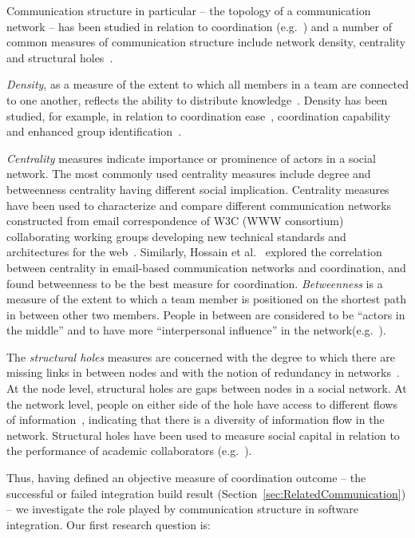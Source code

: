 \documentclass[12pt,oneside]{book}
\begin{document}
Communication structure in particular -- the topology of a communication network
-- has been studied in relation to coordination
(e.g.~\cite{hossain:cscw:2006,hinds:cscw:2006}) and a number of common measures of
communication structure include network density, centrality and structural
holes~\cite{Wasserman:1994sq,Freeman:1979rl}.


\emph{Density}, as a measure of the extent to which all members in a team are
connected to one another, reflects the ability to distribute
knowledge~\cite{Rulke:2000ys}. Density has been studied, for example, in relation
to coordination ease~\cite{hinds:cscw:2006}, coordination
capability~\cite{hossain:cscw:2006} and enhanced group
identification~\cite{RayReagans:2001os}.


\emph{Centrality} measures indicate importance or prominence of actors in a
social network. The most commonly used centrality measures include degree and
betweenness centrality having different social implication. Centrality measures
have been used to characterize and compare different communication networks
constructed from email correspondence of W3C (WWW consortium) collaborating
working groups developing new technical standards and architectures for the
web~\cite{Gloor:2003cikm}. Similarly, Hossain et al.~\cite{hossain:cscw:2006}
explored the correlation between centrality in email-based communication networks
and coordination, and found betweenness to be the best measure for coordination.
\emph{Betweenness} is a measure of the extent to which a team member is
positioned on the shortest path in between other two members. People in between
are considered to be ``actors in the middle'' and to have more ``interpersonal
influence'' in the
network(e.g.~\cite{Gloor:2003cikm,zimmermann:icse:2008,hossain:cscw:2006}).

The \emph{structural holes} measures are concerned with the degree to which there
are missing links in between nodes and with the notion of redundancy in
networks~\cite{Burt:1995vo}. At the node level, structural holes are gaps between
nodes in a social network. At the network level, people on either side of the
hole have access to different flows of information~\cite{Hargadon:1997asq},
indicating that there is a diversity of information flow in the network.
Structural holes have been used to measure social capital in relation to the
performance of academic collaborators (e.g.~\cite{Brambila:PICMET2007}).


Thus, having defined an objective measure of coordination outcome -- the
successful or failed integration build result
(Section~\ref{sec:RelatedCommunication}) -- we investigate the role played by
communication structure in software integration. Our first research question is:
\end{document}
